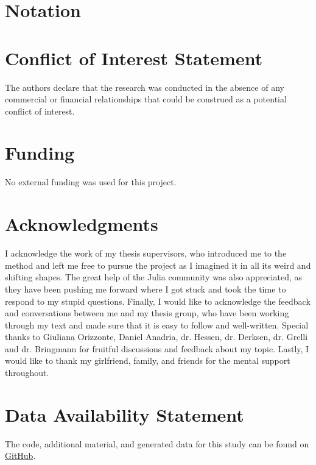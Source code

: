\documentclass[utf8]{FrontiersinVancouver}
\begin{document}
\section*{Notation}

\section*{Conflict of Interest Statement}
The authors declare that the research was conducted in the absence of any commercial or financial relationships that could be construed as a potential conflict of interest.

\section*{Funding}
No external funding was used for this project.

\section*{Acknowledgments}
I acknowledge the work of my thesis supervisors, who introduced me to the method and left me free to pursue the project as I imagined it in all its weird and shifting shapes.  The great help of the Julia community was also appreciated, as they have been pushing me forward where I got stuck and took the time to respond to my stupid questions. Finally, I would like to acknowledge the feedback and conversations between me and my thesis group, who have been working through my text and made sure that it is easy to follow and well-written. Special thanks to Giuliana Orizzonte, Daniel Anadria, dr. Hessen, dr. Derksen, dr. Grelli and dr. Bringmann for fruitful discussions and feedback about my topic. Lastly, I would like to thank my girlfriend, family, and friends for the mental support throughout.

\section*{Data Availability Statement}
The code, additional material, and generated data for this study can be found on \href{https://github.com/MvanSteenbergen/MasterThesisRQA}{GitHub}.


\end{document}
